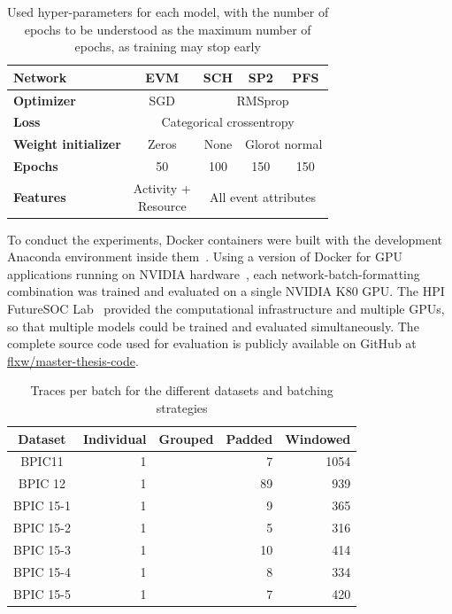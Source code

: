\begin{table}[ht!]
\centering
\begin{tabular}{lcccc}
\textbf{Network}&\textbf{EVM}&\textbf{SCH}&\textbf{SP2}&\textbf{PFS}\\
\hline
\textbf{Optimizer} & SGD & \multicolumn{3}{c}{RMSprop} \\
\textbf{Loss}      &\multicolumn{4}{c}{Categorical crossentropy}\\
\textbf{Weight initializer} & Zeros & None & \multicolumn{2}{c}{Glorot normal}\\
\textbf{Epochs}    & 50 & 100 & 150 & 150\\
\textbf{Features}  & \makecell{Activity +\\Resource} & \multicolumn{3}{c}{All event attributes}\\
\end{tabular}
\caption[Used hyper-parameters for each model]{Used hyper-parameters for each model, with the number of epochs to be understood as the maximum number of epochs, as training may stop early}
\label{tab:model-setup}
\end{table}

To conduct the experiments, Docker containers were built with the development Anaconda environment inside them~\cite{web:docker}. Using a version of Docker for GPU applications running on NVIDIA hardware~\cite{web:nvidia-docker}, each network-batch-formatting combination was trained and evaluated on a single NVIDIA K80 GPU. The HPI FutureSOC Lab~\cite{web:fsoc} provided the computational infrastructure and multiple GPUs, so that multiple models could be trained and evaluated simultaneously. The complete source code used for evaluation is publicly available on GitHub at \href{https://github.com/flxw/master-thesis-code}{flxw/master-thesis-code}.

\begin{table}
\centering
\begin{tabular}{c|rrrr}
Dataset & Individual & Grouped & Padded & Windowed \\
\hline
BPIC11    & 1 & & 7 & 1054\\
BPIC 12   & 1 & & 89 & 939\\
BPIC 15-1 & 1 & & 9 & 365\\
BPIC 15-2 & 1 & & 5 & 316\\
BPIC 15-3 & 1 & & 10 & 414\\
BPIC 15-4 & 1 & & 8 & 334\\
BPIC 15-5 & 1 & & 7 & 420\\
\end{tabular}
\caption[Batch sizes for each dataset and strategy]{Traces per batch for the different datasets and batching strategies}
\label{tab:batch-sizes}
\end{table}


